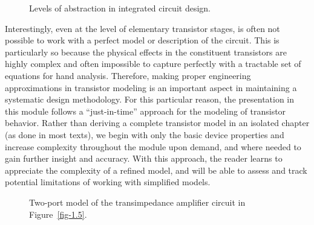 \documentclass[
  11pt,
  letterpaper,
  abstract]{scrbook}
\begin{document}
\begin{figure}


\caption{\label{fig-1.6}Levels of abstraction in integrated circuit
design.}

\end{figure}%

Interestingly, even at the level of elementary transistor stages, is
often not possible to work with a perfect model or description of the
circuit. This is particularly so because the physical effects in the
constituent transistors are highly complex and often impossible to
capture perfectly with a tractable set of equations for hand analysis.
Therefore, making proper engineering approximations in transistor
modeling is an important aspect in maintaining a systematic design
methodology. For this particular reason, the presentation in this module
follows a ``just-in-time'' approach for the modeling of transistor
behavior. Rather than deriving a complete transistor model in an
isolated chapter (as done in most texts), we begin with only the basic
device properties and increase complexity throughout the module upon
demand, and where needed to gain further insight and accuracy. With this
approach, the reader learns to appreciate the complexity of a refined
model, and will be able to assess and track potential limitations of
working with simplified models.

\begin{figure}


\caption{\label{fig-1.7}Two-port model of the transimpedance amplifier
circuit in Figure~\ref{fig-1.5}.}

\end{figure}%
\end{document}
